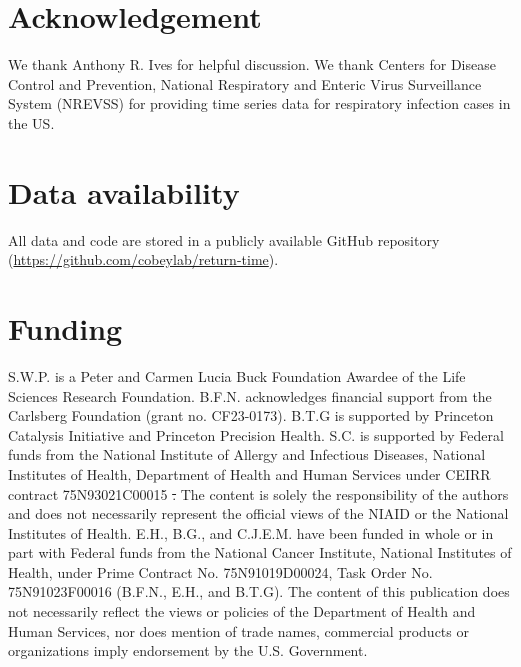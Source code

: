 \documentclass[12pt]{article}
\providecommand{\DIFaddtex}[1]{{\protect\color{blue}\uwave{#1}}} %
\providecommand{\DIFdeltex}[1]{{\protect\color{red}\sout{#1}}}                      %
\providecommand{\DIFaddbegin}{} %
\providecommand{\DIFaddend}{} %
\providecommand{\DIFdelbegin}{} %
\providecommand{\DIFdelend}{} %
\providecommand{\DIFadd}[1]{\texorpdfstring{\DIFaddtex{#1}}{#1}} %
\providecommand{\DIFdel}[1]{\texorpdfstring{\DIFdeltex{#1}}{}} %
\newcommand{\DIFscaledelfig}{0.5}
\newlength{\DIFdelgraphicswidth} %
\newlength{\DIFdelgraphicsheight} %
\newcommand{\DIFaddincludegraphics}[2][]{{\color{blue}\fbox{\DIFOincludegraphics[#1]{#2}}}} %
\newcommand{\DIFdelincludegraphics}[2][]{%
\sbox{\DIFdelgraphicsbox}{\DIFOincludegraphics[#1]{#2}}%
\settoboxwidth{\DIFdelgraphicswidth}{\DIFdelgraphicsbox} %
\settoboxtotalheight{\DIFdelgraphicsheight}{\DIFdelgraphicsbox} %
\scalebox{\DIFscaledelfig}{%
\parbox[b]{\DIFdelgraphicswidth}{\usebox{\DIFdelgraphicsbox}\\[-\baselineskip] \rule{\DIFdelgraphicswidth}{0em}}\llap{\resizebox{\DIFdelgraphicswidth}{\DIFdelgraphicsheight}{%
\setlength{\unitlength}{\DIFdelgraphicswidth}%
\begin{picture}(1,1)%
\thicklines\linethickness{2pt} %
{\color[rgb]{1,0,0}\put(0,0){\framebox(1,1){}}}%
{\color[rgb]{1,0,0}\put(0,0){\line( 1,1){1}}}%
{\color[rgb]{1,0,0}\put(0,1){\line(1,-1){1}}}%
\end{picture}%
}\hspace*{3pt}}} %
} %
\DeclareRobustCommand{\DIFaddbegin}{\DIFOaddbegin \let\includegraphics\DIFaddincludegraphics} %
\DeclareRobustCommand{\DIFaddend}{\DIFOaddend \let\includegraphics\DIFOincludegraphics} %
\DeclareRobustCommand{\DIFdelbegin}{\DIFOdelbegin \let\includegraphics\DIFdelincludegraphics} %
\DeclareRobustCommand{\DIFdelend}{\DIFOaddend \let\includegraphics\DIFOincludegraphics} %
\begin{document}
\section*{Acknowledgement}

We thank Anthony R. Ives for helpful discussion.
We thank Centers for Disease Control and Prevention, National Respiratory and Enteric Virus Surveillance System (NREVSS) for providing time series data for respiratory infection cases in the US.

\section*{Data availability}

All data and code are stored in a publicly available GitHub repository (\url{https://github.com/cobeylab/return-time}).

\section*{Funding}

S.W.P. is a Peter and Carmen Lucia Buck Foundation Awardee of the Life Sciences Research Foundation. 
B.F.N. acknowledges financial support from the Carlsberg Foundation (grant no. CF23-0173).
B.T.G is supported by Princeton Catalysis Initiative and Princeton Precision Health.
S.C. is supported by Federal funds from the National Institute of Allergy and Infectious Diseases, National Institutes of Health, Department of Health and Human Services under CEIRR contract 75N93021C00015 \DIFdelbegin \DIFdel{.
}\DIFdelend \DIFaddbegin \DIFadd{- Subcontract 77789.
}\DIFaddend The content is solely the responsibility of the authors and does not necessarily represent the official views of the NIAID or the National Institutes of Health. 
E.H., B.G., and C.J.E.M. have been funded in whole or in part with Federal funds from the National Cancer Institute, National Institutes of Health, under Prime Contract No. 75N91019D00024, Task Order No. 75N91023F00016 (B.F.N., E.H., and B.T.G). 
The content of this publication does not necessarily reflect the views or policies of the Department of Health and Human Services, nor does mention of trade names, commercial products or organizations imply endorsement by the U.S. Government.

\pagebreak


\end{document}
